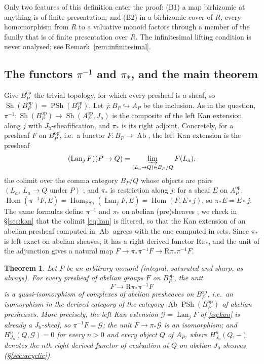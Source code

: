 \documentclass[11pt]{article}
\newcommand{\Hom}{\operatorname{Hom}}
\newcommand{\Sh}{\operatorname{Sh}}
\newcommand{\PSh}{\operatorname{PSh}}
\newcommand{\Ab}{\operatorname{Ab}}
\newcommand{\R}{\mathrm R}
\newcommand{\Jb}{J_{\mathrm b}}
\newcommand{\G}{\mathcal G}
\newcommand{\Lan}{\operatorname{Lan}}
\newtheorem{theorem}{Theorem}[section]
\theoremstyle{definition}
\theoremstyle{remark}
\begin{document}
Only two features of this definition enter the proof:
(B1) a map birhizomic at anything is of finite presentation; and
(B2) in a birhizomic cover of \(R\), every homomorphism from \(R\) to
a valuative monoid factors through a member of the family that is of finite
presentation over \(R\).
The infinitesimal lifting condition is never analysed; see
Remark~\ref{rem:infinitesimal}.

\subsection{The functors \texorpdfstring{\(\pi^{-1}\)}{pi\^{}-1} and
  \texorpdfstring{\(\pi_*\)}{pi\_*}, and the main theorem}
\label{sec:functors}

Give \(B_P^{\mathrm{op}}\) the trivial topology, for which every presheaf is a
sheaf, so \(\Sh(B_P^{\mathrm{op}})=\PSh(B_P^{\mathrm{op}})\).  Let
\(j:B_P\hookrightarrow A_P\) be the inclusion.  As in the question,
\(\pi^{-1}:\Sh(B_P^{\mathrm{op}})\to\Sh(A_P^{\mathrm{op}},\Jb)\) is the
composite of the left Kan extension along \(j\) with \(\Jb\)-sheafification,
and \(\pi_*\) is its right adjoint.  Concretely, for a presheaf \(F\) on
\(B_P^{\mathrm{op}}\), i.e.\ a functor \(F:B_P\to\Ab\), the left Kan extension
is the presheaf
\begin{equation}
  (\Lan_jF)(P\to Q)
   =\varinjlim_{(L_a\to Q)\in B_P/Q}F(L_a),
  \label{eq:kan}
\end{equation}
the colimit over the comma category \(B_P/Q\) whose objects are pairs
\((L_a,\ L_a\to Q\text{ under }P)\) \cite[Tags 00VC, 00VE]{stacks}; and
\(\pi_*\) is restriction along \(j\): for a sheaf \(E\) on
\(A_P^{\mathrm{op}}\),
\(\Hom(\pi^{-1}F,E)=\Hom_{\PSh}(\Lan_jF,E)=\Hom(F,E\circ j)\), so
\(\pi_*E=E\circ j\).  The same formulas define \(\pi^{-1}\) and \(\pi_*\) on
abelian (pre)sheaves \cite[Tag 00VF]{stacks}; we check in \S\ref{sec:kan}
that the colimit
\eqref{eq:kan} is filtered, so that the Kan extension of an abelian presheaf
computed in \(\Ab\) agrees with the one computed in sets.  Since \(\pi_*\) is
left exact on abelian sheaves, it has a right derived functor \(\R\pi_*\),
and the unit of the adjunction gives a natural map
\(F\to\pi_*\pi^{-1}F\to\R\pi_*\pi^{-1}F\).

\begin{theorem}\label{thm:main}
Let \(P\) be an arbitrary monoid (integral, saturated and sharp, as
always).  For every presheaf of
abelian groups \(F\) on \(B_P^{\mathrm{op}}\), the unit
\[
             F\longrightarrow \R\pi_*\pi^{-1}F
\]
is a quasi-isomorphism of complexes of abelian presheaves on
\(B_P^{\mathrm{op}}\), i.e.\ an isomorphism in the derived category of
the category \(\Ab\PSh(B_P^{\mathrm{op}})\) of abelian presheaves.  More precisely, the left Kan extension
\(\G=\Lan_jF\) of \eqref{eq:kan} is already a \(\Jb\)-sheaf, so
\(\pi^{-1}F=\G\); the unit \(F\to\pi_*\G\) is an isomorphism; and
\(H^n_{\Jb}(Q,\G)=0\) for every \(n>0\) and every object \(Q\) of \(A_P\),
where \(H^n_{\Jb}(Q,-)\) denotes the \(n\)th right derived functor of
evaluation at \(Q\) on abelian \(\Jb\)-sheaves (\S\ref{sec:acyclic}).
\end{theorem}
\end{document}
